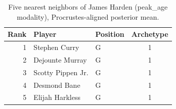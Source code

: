 \begin{table}[htbp]
  \centering\small
  \begin{tabular}{rllc}
    \toprule
    Rank & Player & Position & Archetype \\
    \midrule
    1 & Stephen Curry & G & 1 \\
    2 & Dejounte Murray & G & 1 \\
    3 & Scotty Pippen Jr. & G & 1 \\
    4 & Desmond Bane & G & 1 \\
    5 & Elijah Harkless & G & 1 \\
    \bottomrule
  \end{tabular}
  \caption{Five nearest neighbors of James Harden (peak_age modality), Procrustes-aligned posterior mean.}
  \label{tab:James_Harden_neighbors_peak_age}
\end{table}

